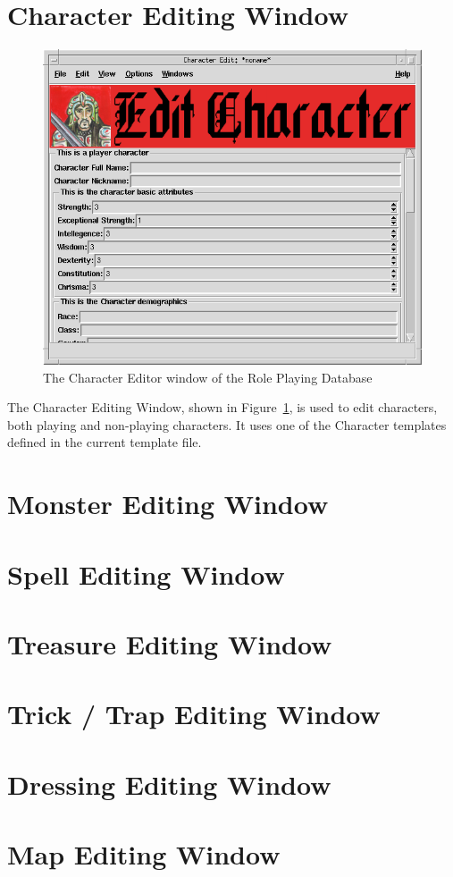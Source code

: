 \section{Character Editing Window}
\label{Character}

\begin{figure}[hbpt]
\begin{centering}
\includegraphics[width=5in]{CharacterEditor.png}
\caption{The Character Editor window of the Role Playing Database}
\label{fig:char}
\end{centering}
\end{figure}
The Character Editing Window, shown in Figure~\ref{fig:char}, is used to
edit characters, both playing and non-playing characters.  It uses one
of the Character templates defined in the current template file.

\section{Monster Editing Window}
\label{Monster}

\section{Spell Editing Window}
\label{Spell}

\section{Treasure Editing Window}
\label{Treasure}

\section{Trick / Trap Editing Window}
\label{TrickTrap}

\section{Dressing Editing Window}
\label{Dressing}

\section{Map Editing Window}
\label{Map}


